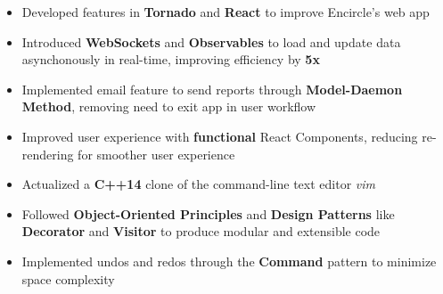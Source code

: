 \documentclass[10pt,a4paper,ragged2e]{altacv}
\begin{document}

\begin{fullwidth}
    \makecvheader
\end{fullwidth}




\begin{itemize}
    \item Developed features in \textbf{Tornado} and \textbf{React} to improve Encircle's web app
    \item Introduced \textbf{WebSockets} and \textbf{Observables} to load and update data asynchonously in real-time, improving efficiency by \textbf{5x}
    \item Implemented email feature to send reports through \textbf{Model-Daemon Method}, removing need to exit app in user workflow
    \item Improved user experience with \textbf{functional} React Components, reducing re-rendering for smoother user experience 
\end{itemize}


\begin{itemize}
    \item Actualized a \textbf{C++14} clone of the command-line text editor \textit{vim}
    \item Followed \textbf{Object-Oriented Principles} and \textbf{Design Patterns} like \textbf{Decorator} and \textbf{Visitor} to produce modular and extensible code
    \item Implemented undos and redos through the \textbf{Command} pattern to minimize space complexity
\end{itemize}
\end{document}
